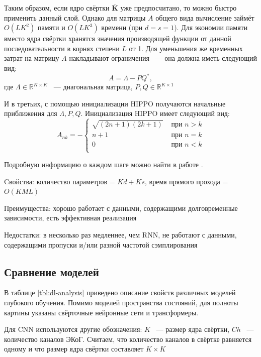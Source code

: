 \documentclass[a4paper, 12pt]{article}
\newcommand{\dR}{\mathds{R}}
\begin{document}
	Таким образом, если ядро свёртки $\overline{\mathbf{K}}$ уже предпосчитано, то можно быстро применить данный слой.
	Однако для матрицы $A$ общего вида вычисление займёт $O(LK^2)$ памяти и $O(LK^3)$ времени (при $d=s=1$).
	Для экономии памяти вместо ядра свёртки хранятся значения производящей функции от данной последовательности в корнях степени $L$ от 1.
	Для уменьшения же временных затрат на матрицу $A$ накладывают ограничения ~--- она должна иметь следующий вид:
	$$ A = \Lambda - PQ^*,$$
	где $\Lambda \in \dR^{K \times K}$ ~--- диагональная матрица, $P, Q \in \dR^{K \times 1}$
	
	И в третьих, с помощью инициализации HIPPO получаются начальные приближения для $\Lambda, P, Q$.
	Инициализация HIPPO имеет следующий вид:
	\begin{equation*}
		A_{nk} = -
		\begin{cases}
			\sqrt{(2n+1)(2k+1)} &\text{ при } n > k \\
			n+1 &\text{ при } n = k \\
			0 &\text{ при } n < k \\
		\end{cases}
	\end{equation*}

	
	Подробную информацию о каждом шаге можно найти в работе \citep{s4}.
	
	Cвойства: количество параметров = $Kd + Ks$, время прямого прохода = $O(KML)$

	Преимущества: хорошо работает с данными, содержащими долговременные зависимости, есть эффективная реализация \citep{s4-git}
	
	Недостатки: в несколько раз медленнее, чем RNN, не работают с данными, содержащими пропуски и/или разной частотой сэмплирования
		
	\subsection{Сравнение моделей}
	В таблице \ref{tbl:dl-analysis} приведено описание свойств различных моделей глубокого обучения. Помимо моделей пространства состояний, для полноты картины указаны свёрточные нейронные сети и трансформеры.
	
	Для CNN используются другие обозначения: $K$ ~--- размер ядра свёртки, $Ch$ ~--- количество каналов ЭКоГ. Считаем, что количество каналов в свёртке равняется одному и что размер ядра свёртки составляет $K \times K$
	
\end{document}
